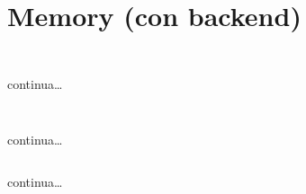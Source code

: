 
\section[Memory]{Memory (con backend)}
\begin{frame}[fragile]\transfade
  \begin{sol}\centering
    \inputminted{json}{memory/node/package.json}
  \end{sol}
\end{frame}


\begin{frame}[fragile]\transfade
  \begin{sol}\centering
    \inputminted[lastline=18]{html}{memory/node/public/memory.html}
    continua\dots
  \end{sol}
\end{frame}
\begin{frame}[fragile]\transfade
  \begin{sol}\centering
    \inputminted[firstline=20,breaklines,fontsize=\tiny]{html}{memory/node/public/memory.html}
  \end{sol}
\end{frame}


\begin{frame}[fragile]\transfade
  \begin{sol}\centering
    \inputminted[breaklines, lastline=21]{css}{memory/node/public/memory.css}
    continua\dots
  \end{sol}
\end{frame}
\begin{frame}[fragile]\transfade
  \begin{sol}\centering
    \inputminted[breaklines, firstline=23, lastline=44]{css}{memory/node/public/memory.css}
    continua\dots
  \end{sol}
\end{frame}
\begin{frame}[fragile]\transfade
  \begin{sol}\centering
    \inputminted[breaklines, firstline=45]{css}{memory/node/public/memory.css}
  \end{sol}
\end{frame}

